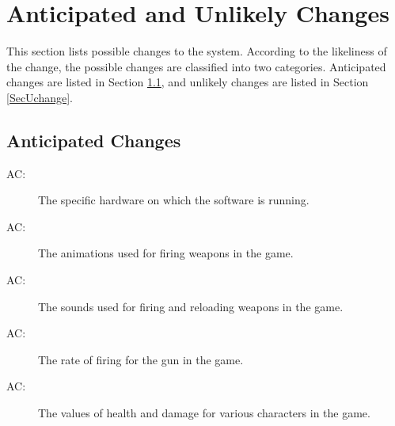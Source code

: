\documentclass[12pt, titlepage]{article}
\newcounter{acnum}
\newcommand{\actheacnum}{AC\theacnum}
\begin{document}


\section{Anticipated and Unlikely Changes} \label{SecChange}

This section lists possible changes to the system. According to the likeliness
of the change, the possible changes are classified into two
categories. Anticipated changes are listed in Section \ref{SecAchange}, and
unlikely changes are listed in Section \ref{SecUchange}.

\subsection{Anticipated Changes} \label{SecAchange}

\begin{description}
\item[ \actheacnum \label{acHardware}:] The specific
  hardware on which the software is running.
\item[ \actheacnum \label{acAnimations}:] The animations used for firing weapons in the game.
\item[ \actheacnum \label{acSounds}:] The sounds used for firing and reloading weapons in the game.
\item[ \actheacnum \label{acFireRate}:] The rate of firing for the gun in the game.
\item[ \actheacnum \label{acHealth}:] The values of health and damage for various characters in the game.
\end{description}
\end{document}
